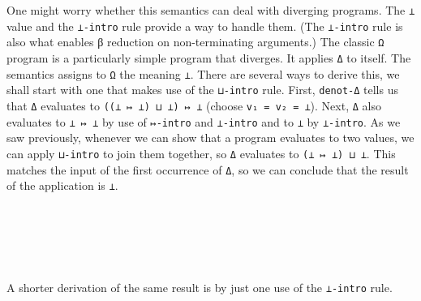 One might worry whether this semantics can deal with diverging programs.
The \texttt{⊥} value and the \texttt{⊥-intro} rule provide a way to
handle them. (The \texttt{⊥-intro} rule is also what enables β reduction
on non-terminating arguments.) The classic \texttt{Ω} program is a
particularly simple program that diverges. It applies \texttt{Δ} to
itself. The semantics assigns to \texttt{Ω} the meaning \texttt{⊥}.
There are several ways to derive this, we shall start with one that
makes use of the \texttt{⊔-intro} rule. First, \texttt{denot-Δ} tells us
that \texttt{Δ} evaluates to \texttt{((⊥\ ↦\ ⊥)\ ⊔\ ⊥)\ ↦\ ⊥} (choose
\texttt{v₁\ =\ v₂\ =\ ⊥}). Next, \texttt{Δ} also evaluates to
\texttt{⊥\ ↦\ ⊥} by use of \texttt{↦-intro} and \texttt{⊥-intro} and to
\texttt{⊥} by \texttt{⊥-intro}. As we saw previously, whenever we can
show that a program evaluates to two values, we can apply
\texttt{⊔-intro} to join them together, so \texttt{Δ} evaluates to
\texttt{(⊥\ ↦\ ⊥)\ ⊔\ ⊥}. This matches the input of the first occurrence
of \texttt{Δ}, so we can conclude that the result of the application is
\texttt{⊥}.

\begin{fence}
\begin{code}%
\>[0]\AgdaSpace{}%
\AgdaSymbol{:}\AgdaSpace{}%
\AgdaSpace{}%
\AgdaSpace{}%
\<%
\\
\>[0]\AgdaSpace{}%
\AgdaSymbol{=}\AgdaSpace{}%
\AgdaSpace{}%
\AgdaSpace{}%
\<%
\\
%
\\[\AgdaEmptyExtraSkip]%
\>[0]\AgdaSpace{}%
\AgdaSymbol{:}\AgdaSpace{}%
\AgdaSpace{}%
\AgdaSpace{}%
\AgdaSpace{}%
\AgdaSpace{}%
\<%
\\
\>[0]\AgdaSpace{}%
\AgdaSymbol{=}\AgdaSpace{}%
\AgdaSpace{}%
\AgdaSpace{}%
\AgdaSymbol{(}\AgdaSpace{}%
\AgdaSymbol{(}\AgdaSpace{}%
\AgdaSymbol{)}\AgdaSpace{}%
\AgdaSymbol{)}\<%
\end{code}
\end{fence}

A shorter derivation of the same result is by just one use of the
\texttt{⊥-intro} rule.

